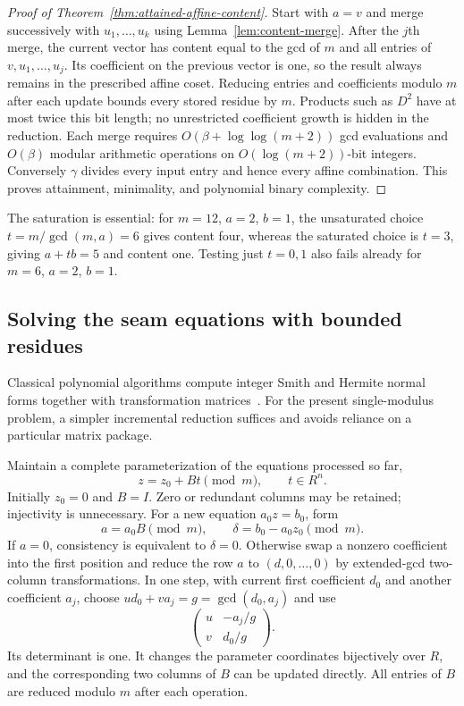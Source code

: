 \begin{proof}[Proof of Theorem~\ref{thm:attained-affine-content}]
Start with $a=v$ and merge successively with $u_1,\ldots,u_k$ using
Lemma~\ref{lem:content-merge}.  After the $j$th merge, the current vector
has content equal to the gcd of $m$ and all entries of
$v,u_1,\ldots,u_j$.  Its coefficient on the previous vector is one, so
the result always remains in the prescribed affine coset.  Reducing
entries and coefficients modulo $m$ after each update bounds every stored
residue by $m$. Products such as $D^2$ have at most twice this bit length;
no unrestricted coefficient growth is hidden in the reduction.  Each merge requires $O(\beta+\log\log(m+2))$ gcd
evaluations and $O(\beta)$ modular arithmetic operations on
$O(\log(m+2))$-bit integers.  Conversely $\gamma$ divides every input
entry and hence every affine combination.  This proves attainment,
minimality, and polynomial binary complexity.
\end{proof}

The saturation is essential: for $m=12$, $a=2$, $b=1$, the unsaturated
choice $t=m/\gcd(m,a)=6$ gives content four, whereas the saturated
choice is $t=3$, giving $a+tb=5$ and content one.  Testing just
$t=0,1$ also fails already for $m=6$, $a=2$, $b=1$.

\subsection{Solving the seam equations with bounded residues}

Classical polynomial algorithms compute integer Smith and Hermite normal
forms together with transformation matrices~\cite{kannan-bachem}.
For the present single-modulus problem, a simpler incremental reduction
suffices and avoids reliance on a particular matrix package.

Maintain a complete parameterization of the equations processed so far,
\[
 z=z_0+B t\pmod m,\qquad t\in R^n.
\]
Initially $z_0=0$ and $B=I$.  Zero or redundant columns may be retained;
injectivity is unnecessary.  For a new equation $a_0 z=b_0$, form
\[
 a=a_0B\pmod m,\qquad \delta=b_0-a_0z_0\pmod m.
\]
If $a=0$, consistency is equivalent to $\delta=0$.  Otherwise swap a
nonzero coefficient into the first position and reduce the row $a$ to
$(d,0,\ldots,0)$ by extended-gcd two-column transformations.  In one step,
with current first coefficient $d_0$ and another coefficient $a_j$,
choose $u d_0+v a_j=g=\gcd(d_0,a_j)$ and use
\[
 \begin{pmatrix}u&-a_j/g\\v&d_0/g\end{pmatrix}.
\]
Its determinant is one.  It changes the parameter coordinates bijectively
over $R$, and the corresponding two columns of $B$ can be updated directly.
All entries of $B$ are reduced modulo $m$ after each operation.

